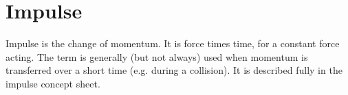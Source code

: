 \section{Impulse}
Impulse is the change of momentum.  It is force times time, for a constant force acting.  The term is generally (but not always) used when momentum is transferred over a short time (e.g. during a collision).  It is described fully in the impulse concept sheet.


